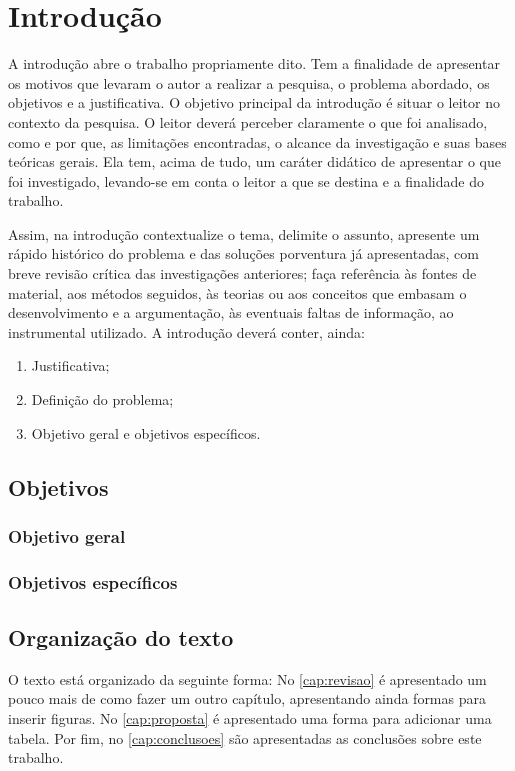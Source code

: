 \chapter{Introdução}\label{cap:introducao}

A introdução abre o trabalho propriamente dito. Tem a finalidade de apresentar os motivos que levaram o autor a realizar a pesquisa, o problema abordado, os objetivos e a justificativa. O objetivo principal da introdução é situar o leitor no contexto da pesquisa. O leitor deverá perceber claramente o que foi analisado, como e por que, as limitações encontradas, o alcance da investigação e suas bases teóricas gerais. Ela tem, acima de tudo, um caráter didático de apresentar o que foi investigado, levando-se em conta o leitor a que se destina e a finalidade do trabalho. 

Assim, na introdução contextualize o tema, delimite o assunto, apresente um rápido histórico do problema e das soluções porventura já apresentadas, com breve revisão crítica das investigações anteriores; faça referência às fontes de material, aos métodos seguidos, às teorias ou aos conceitos que embasam o desenvolvimento e a argumentação, às eventuais faltas de informação, ao instrumental utilizado. A introdução deverá conter, ainda:

\begin{enumerate}
   \item Justificativa;
   \item Definição do problema;
   \item Objetivo geral e objetivos específicos.
\end{enumerate}

\section{Objetivos}

\subsection{Objetivo geral}

\subsection{Objetivos específicos}


\section{Organização do texto}

O texto está organizado da seguinte forma: No \autoref{cap:revisao} é apresentado um pouco mais de como fazer um outro capítulo, apresentando ainda formas para inserir figuras. No \autoref{cap:proposta} é apresentado uma forma para adicionar uma tabela. Por fim, no \autoref{cap:conclusoes} são apresentadas as conclusões sobre este trabalho.